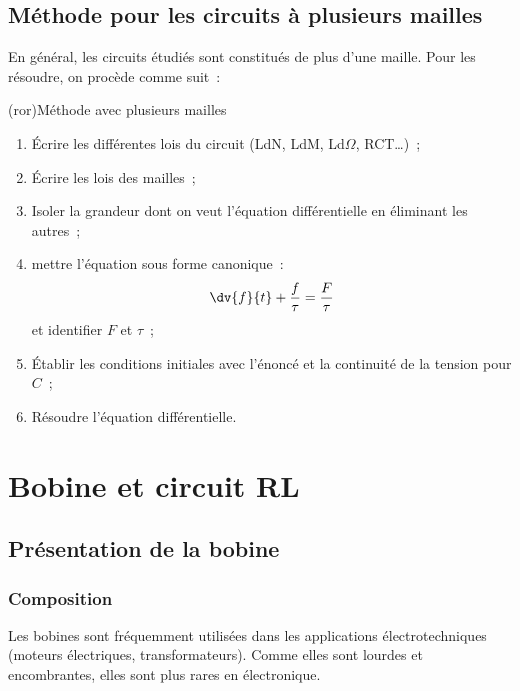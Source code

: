 \documentclass[../../main/main.tex]{subfiles}
\begin{document}
\subsection{Méthode pour les circuits à plusieurs mailles}
En général, les circuits étudiés sont constitués de plus d'une maille. Pour les
résoudre, on procède comme suit~:
\begin{tcb}(ror){Méthode avec plusieurs mailles}
	\begin{enumerate}[label=\sqenumi]
		\item Écrire les différentes lois du circuit (LdN, LdM, Ld$\Omega$, RCT…)~;
		\item Écrire les lois des mailles~;
		\item Isoler la grandeur dont on veut l'équation différentielle en éliminant
		      les autres~;
		\item mettre l'équation sous forme canonique~:
		      \[
			      \dv{f}{t} + \frac{f}{\tau} = \frac{F}{\tau}
		      \]
		      et identifier $F$ et $\tau$~;
		\item Établir les conditions initiales avec l'énoncé et la continuité de la
		      tension pour $C$~;
		\item Résoudre l'équation différentielle.
	\end{enumerate}

\end{tcb}

\section{Bobine et circuit RL}
\subsection{Présentation de la bobine}
\subsubsection{Composition}

Les bobines sont fréquemment utilisées dans les applications électrotechniques
(moteurs électriques, transformateurs). Comme elles sont lourdes et
encombrantes, elles sont plus rares en électronique.
\end{document}
